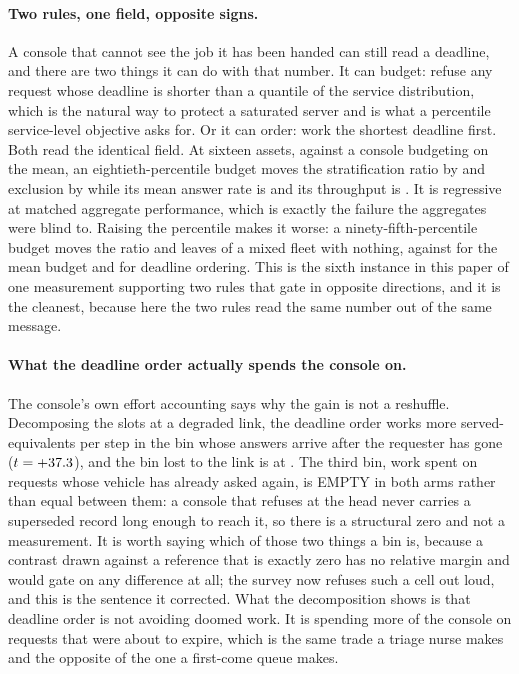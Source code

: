\documentclass[11pt]{article}
\begin{document}
\paragraph{Two rules, one field, opposite signs.} A console that cannot see the job it has been
handed can still read a deadline, and there are two things it can do with that number. It can budget:
refuse any request whose deadline is shorter than a quantile of the service distribution, which is
the natural way to protect a saturated server and is what a percentile service-level objective asks
for. Or it can order: work the shortest deadline first. Both read the identical field. At sixteen
assets, against a console budgeting on the mean, an eightieth-percentile budget moves the
stratification ratio by \FqQEightyRatio{} and exclusion by \FqQEightyStarv{} while its mean answer
rate is \FqQEightyRateV{} and its throughput is \FqQEightySrvV{}. It is regressive at matched
aggregate performance, which is exactly the failure the aggregates were blind to. Raising the
percentile makes it worse: a ninety-fifth-percentile budget moves the ratio \FqQNinetyfiveRatio{}
and leaves \FqLvQNinetyfiveStarv{} of a mixed fleet with nothing, against \FqLvMeanStarv{} for the
mean budget and \FqLvEdfBStarv{} for deadline ordering. This is the sixth instance in this paper of
one measurement supporting two rules that gate in opposite directions, and it is the cleanest,
because here the two rules read the same number out of the same message.

\paragraph{What the deadline order actually spends the console on.} The console's own effort
accounting says why the gain is not a reshuffle. Decomposing the slots at a degraded link, the
deadline order works \FeLate{} more served-equivalents per step in the bin whose answers arrive after
the requester has gone ($t = +37.3{}$), and the bin lost to the link is \FeLostV{} at \FeLost{}.
The third bin, work spent on requests whose vehicle has already asked again, is EMPTY in both arms
rather than equal between them: a console that refuses at the head never carries a superseded record
long enough to reach it, so \FeStale{} there is a structural zero and not a measurement. It is worth
saying which of those two things a bin is, because a contrast drawn against a reference that is
exactly zero has no relative margin and would gate on any difference at all; the survey now refuses
such a cell out loud, and this is the sentence it corrected. What the decomposition shows is that
deadline order is not avoiding doomed work. It is spending more of the console on requests that were about to expire, which is the
same trade a triage nurse makes and the opposite of the one a first-come queue makes.
\end{document}

